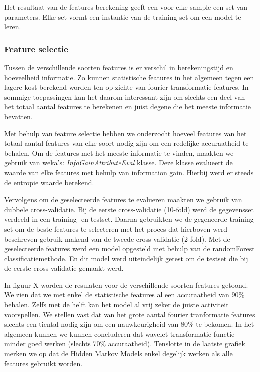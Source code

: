 \documentclass{article}
\begin{document}
Het resultaat van de features berekening geeft een voor elke sample een set van parameters. Elke set vormt een instantie van de training set om een model te leren.

\subsubsection{Feature selectie}
Tussen de verschillende soorten features is er verschil in berekeningstijd en hoeveelheid informatie. Zo kunnen statistische features in het algemeen tegen een lagere kost berekend worden ten op zichte van fourier transformatie features. In sommige toepassingen kan het daarom interessant zijn om slechts een deel van het totaal aantal features te berekenen en juist degene die het meeste informatie bevatten.

Met behulp van feature selectie hebben we onderzocht hoeveel features van het totaal aantal features van elke soort nodig zijn om een redelijke accuraatheid te behalen. Om de features met het meeste informatie te vinden, maakten we gebruik van weka's: \emph{InfoGainAttributeEval} klasse. %
 Deze klasse evalueert de waarde van elke features met behulp van information gain. Hierbij werd er steeds de entropie waarde berekend.

Vervolgens om de geselecteerde features te evalueren maakten we gebruik van dubbele cross-validatie. Bij de eerste cross-validatie (10-fold) werd de gegevensset verdeeld in een training- en testset. Daarna gebruikten we de gegeneerde training-set om de beste features te selecteren met het proces dat hierboven werd beschreven gebruik makend van de tweede cross-validatie (2-fold). Met de geselecteerde features werd een model opgesteld met behulp van de randomForest classificatiemethode. En dit model werd uiteindelijk getest om de testset die bij de eerste cross-validatie gemaakt werd.
	
In figuur X worden de resulaten voor de verschillende soorten features getoond. We zien dat we met enkel de statistische features al een accuraatheid van 90\% behalen. Zelfs met de helft kan het model al vrij zeker de juiste activiteit voorspellen. We stellen vast dat van het grote aantal fourier tranformatie features slechts een tiental nodig zijn om een nauwkeurigheid van 80\% te bekomen. In het algemeen kunnen we kunnen concluderen dat wavelet transformatie functie minder goed werken (slechts 70\% accuraatheid). Tenslotte in de laatste grafiek merken we op dat de Hidden Markov Models enkel degelijk werken als alle features gebruikt worden.
\end{document}
